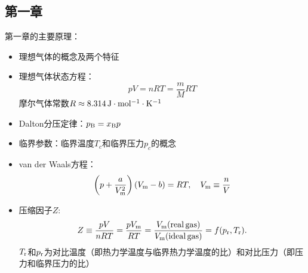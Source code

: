 \documentclass[9pt]{beamer}
\newcommand\B{{\rm B}}
\begin{document}
	\subsection{第一章}
	
	\begin{frame}
	
	第一章的主要原理：
	
	\begin{itemize}
	
	\item 理想气体的概念及两个特征
	
	\item 理想气体状态方程：
	\[
		pV = n R T = \frac{m}{M} R T
	\]
	摩尔气体常数$R \approx 8.314\, {\rm J\cdot mol^{-1} \cdot K^{-1}}$
	
	\item Dalton分压定律：$p_\B = x_\B p$	
	
	\item 临界参数：临界温度$T_c$和临界压力$p_c$的概念
	
	\item van der Waals方程：
	\[
		\left( p + \frac{a}{V^2_{\rm m}} \right) ( V_{\rm m} - b ) = RT, \quad V_{\rm m} \equiv \frac{n}{V}
	\]
	
	\item 压缩因子$Z$:
	\[
		Z \equiv \frac{pV}{nRT} = \frac{pV_{\rm m}}{RT} = \frac{V_{\rm m}({\rm real \, gas})}{V_{\rm m}({\rm ideal \, gas})} = f( p_{\rm r}, T_{\rm r} ).
	\]
	$T_{\rm r}$和$p_{\rm r}$为对比温度（即热力学温度与临界热力学温度的比）和对比压力（即压力和临界压力的比）
	\end{itemize}
	
	\end{frame}
	
\end{document}
